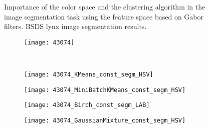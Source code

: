 \begin{figure}[!ht]
	\caption{Importance of the color space and the clustering algorithm in the image segmentation task using the feature space based on Gabor filters. BSDS lynx image segmentation results.}\label{fig:lynx_clustering_method_v_colorspace}    
\end{figure}


\begin{figure}[!ht]
         
    \begin{subfigure}[b]{\textwidth+20pt\relax}
    	\centering
    	\texttt{[image: 43074]} 
    \end{subfigure}  \\ \vspace{-5pt}   
    
    
    \begin{subfigure}[b]{\textwidth+20pt\relax}
    	\centering
    	\texttt{[image: 43074\_KMeans\_const\_segm\_HSV]} 
    \end{subfigure}      
    \begin{subfigure}[b]{0.23\textwidth}
    	\centering
        \texttt{[image: 43074\_MiniBatchKMeans\_const\_segm\_HSV]}
    \end{subfigure}
    \begin{subfigure}[b]{0.23\textwidth}
    	\centering
        \texttt{[image: 43074\_Birch\_const\_segm\_LAB]}
    \end{subfigure}
    \begin{subfigure}[b]{0.23\textwidth}
    	\centering
        \texttt{[image: 43074\_GaussianMixture\_const\_segm\_HSV]}
    \end{subfigure} \\ \vspace{-5pt}
    

\end{figure}
